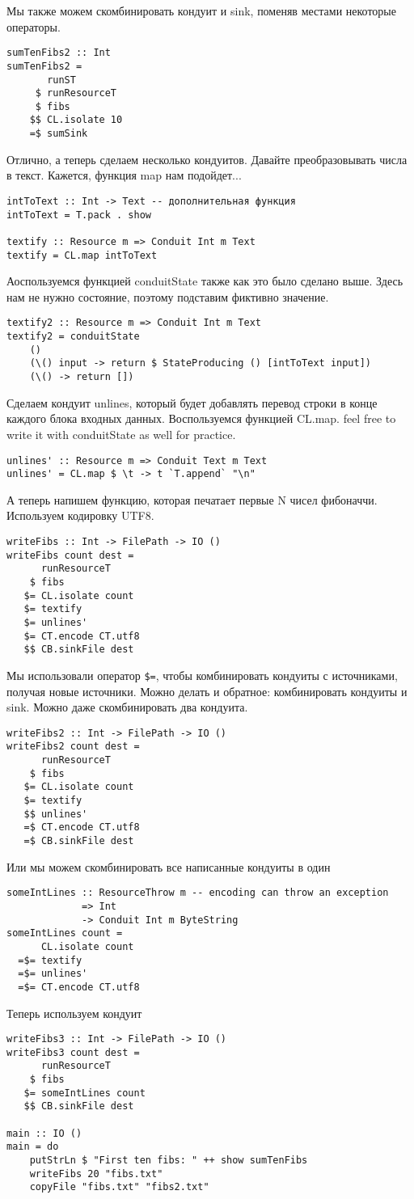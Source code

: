 Мы также можем скомбинировать кондуит и sink, поменяв местами некоторые операторы.
\begin{lstlisting}sumTenFibs2 :: Int
sumTenFibs2 =
       runST
     $ runResourceT
     $ fibs
    $$ CL.isolate 10
    =$ sumSink
\end{lstlisting}
Отлично, а теперь сделаем несколько кондуитов. Давайте преобразовывать числа в текст.
Кажется, функция map нам подойдет...
\begin{lstlisting}
intToText :: Int -> Text -- дополнительная функция 
intToText = T.pack . show

textify :: Resource m => Conduit Int m Text
textify = CL.map intToText
\end{lstlisting}
Аоспользуемся функцией conduitState также как это было сделано выше. Здесь нам не нужно
состояние, поэтому подставим фиктивно значение.
\begin{lstlisting}textify2 :: Resource m => Conduit Int m Text
textify2 = conduitState
    ()
    (\() input -> return $ StateProducing () [intToText input])
    (\() -> return [])
\end{lstlisting}
Сделаем кондуит unlines, который будет добавлять перевод строки в конце каждого блока
входных данных. Воспользуемся функцией CL.map. feel free to write it with conduitState as
well for practice.
\begin{lstlisting}unlines' :: Resource m => Conduit Text m Text
unlines' = CL.map $ \t -> t `T.append` "\n"
\end{lstlisting}
А теперь напишем функцию, которая печатает первые N чисел фибоначчи. Используем
кодировку UTF8.
\begin{lstlisting}writeFibs :: Int -> FilePath -> IO ()
writeFibs count dest =
      runResourceT
    $ fibs
   $= CL.isolate count
   $= textify
   $= unlines'
   $= CT.encode CT.utf8
   $$ CB.sinkFile dest
\end{lstlisting}
Мы использовали оператор \verb#$=#, чтобы комбинировать кондуиты с источниками, получая
новые источники. Можно делать и обратное: комбинировать кондуиты и sink. Можно даже
скомбинировать два кондуита.
\begin{lstlisting}writeFibs2 :: Int -> FilePath -> IO ()
writeFibs2 count dest =
      runResourceT
    $ fibs
   $= CL.isolate count
   $= textify
   $$ unlines'
   =$ CT.encode CT.utf8
   =$ CB.sinkFile dest
\end{lstlisting}
Или мы можем скомбинировать все написанные кондуиты в один
\begin{lstlisting}someIntLines :: ResourceThrow m -- encoding can throw an exception
             => Int
             -> Conduit Int m ByteString
someIntLines count =
      CL.isolate count
  =$= textify
  =$= unlines'
  =$= CT.encode CT.utf8
\end{lstlisting}
Теперь используем кондуит
\begin{lstlisting}
writeFibs3 :: Int -> FilePath -> IO ()
writeFibs3 count dest =
      runResourceT
    $ fibs
   $= someIntLines count
   $$ CB.sinkFile dest

main :: IO ()
main = do
    putStrLn $ "First ten fibs: " ++ show sumTenFibs
    writeFibs 20 "fibs.txt"
    copyFile "fibs.txt" "fibs2.txt"
\end{lstlisting}

